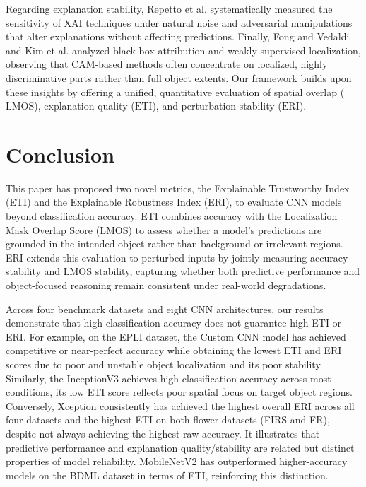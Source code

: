 \documentclass[a4paper,fleqn]{cas-dc}
\begin{document}
	Regarding explanation stability, Repetto et al. \cite{ref21} systematically measured the sensitivity of XAI techniques under natural noise and adversarial manipulations that alter explanations without affecting predictions. 
	Finally, Fong and Vedaldi \cite{ref23} and Kim et al. \cite{r62} analyzed black-box attribution and weakly supervised localization, observing that CAM-based methods often concentrate on localized, highly discriminative parts rather than full object extents. 
	Our framework builds upon these insights by offering a unified, quantitative evaluation of spatial overlap ($\mathrm{LMOS}$), explanation quality ($\mathrm{ETI}$), and perturbation stability ($\mathrm{ERI}$).

	
	\section{Conclusion}     
	\label{sec:conclusion}
	This paper has proposed two novel metrics, the Explainable Trustworthy Index (ETI) and the Explainable Robustness Index (ERI), to evaluate CNN models beyond classification accuracy. 
	ETI combines accuracy with the Localization Mask Overlap Score (LMOS) to assess whether a model's predictions are grounded in the intended object rather than background or irrelevant regions. 
	ERI extends this evaluation to perturbed inputs by jointly measuring accuracy stability and LMOS stability, capturing whether both predictive performance and object-focused reasoning remain consistent under real-world degradations.
	
	Across four benchmark datasets and eight CNN architectures, our results demonstrate that high classification accuracy does not guarantee high ETI or ERI. 
	For example, on the EPLI dataset, the Custom CNN model has achieved competitive or near-perfect accuracy while obtaining the lowest ETI and ERI scores due to poor and unstable object localization and its poor stability
	Similarly, the InceptionV3 achieves high classification accuracy across most conditions, its low ETI score reflects poor spatial focus on target object regions. 
	Conversely, Xception consistently has achieved the highest overall ERI across all four datasets and the highest ETI on both flower datasets (FIRS and FR), despite not always achieving the highest raw accuracy. 
	It illustrates that predictive performance and explanation quality/stability are related but distinct properties of model reliability. 
	MobileNetV2 has outperformed higher-accuracy models on the BDML dataset in terms of ETI, reinforcing this distinction.
	
\end{document}
